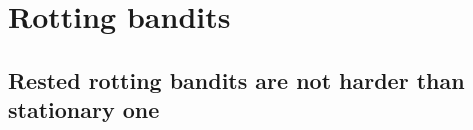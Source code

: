 \part{Rotting bandits}

\chapter{Rested rotting bandits are not harder than stationary one}


%

%




